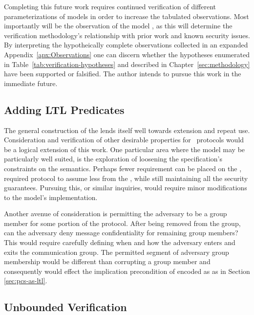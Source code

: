 Completing this future work requires continued verification of different parameterizations of  models in order to increase the tabulated observations.
Most importantly will be the observation of the model , as this will determine the verification methodology's relationship with prior work and known security issues.
By interpreting the hypotheically complete observations collected in an expanded Appendix\ \ref{apx:Observations} one can discern whether the hypotheses enumerated in Table\ \ref{tab:verification-hypotheses} and described in Chapter\ \ref{sec:methodology} have been supported or falsified.
The author intends to pursue this work in the immediate future.


\hypertarget{sec:more-predicates}{%
\subsection{Adding LTL Predicates}\label{sec:more-predicates}}

The general construction of the  lends itself well towards extension and repeat use.
Consideration and verification of other desirable properties for \CGKAdef\ protocols would be a logical extension of this work.
One particular area where the  model may be particularly well suited, is the exploration of loosening the  specification's constraints on the  semantics.
Perhaps fewer requirement can be placed on the , required protocol to assume less from the , while still maintaining all the  security guarantees.
Pursuing this, or similar inquiries, would require minor modifications to the  model's implementation.

Another avenue of consideration is permitting the adversary to be a group member for some portion of the \CGKAdef protocol.
After being removed from the group, can the adversary deny message confidentiality for remaining group members?
This would require carefully defining when and how the adversary enters and exits the communication group.
The permitted segment of adversary group membership would be different than corrupting a group member and consequently would effect the implication precondition of  encoded as  as in Section \ref{sec:pcs-as-ltl}.


\hypertarget{sec:unbounded-verification}{%
\subsection{Unbounded Verification}\label{sec:unbounded-verification}}

